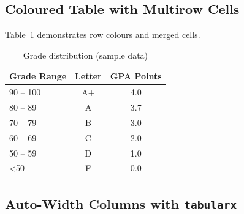\documentclass[12pt, a4paper]{article}
\theoremstyle{definition}
\theoremstyle{plain}
\theoremstyle{remark}
\begin{document}
\subsection{Coloured Table with Multirow Cells}

Table~\ref{tab:coloured} demonstrates row colours and merged cells.

\begin{table}[H]
  \centering
  \caption{Grade distribution (sample data)}
  \label{tab:coloured}
  \begin{tabular}{lcc}
    \toprule
    \rowcolor{PrimaryBlue!20}
    \textbf{Grade Range} & \textbf{Letter} & \textbf{GPA Points} \\
    \midrule
    90 – 100             & A+              & 4.0                 \\
    80 – 89              & A               & 3.7                 \\
    70 – 79              & B               & 3.0                 \\
    60 – 69              & C               & 2.0                 \\
    50 – 59              & D               & 1.0                 \\
    \textless 50         & F               & 0.0                 \\
    \bottomrule
  \end{tabular}
\end{table}

\subsection{Auto-Width Columns with \texttt{tabularx}}
\end{document}
